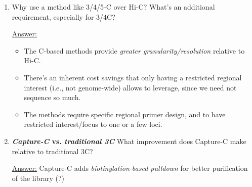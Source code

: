\documentclass{article}
\newenvironment{QandA}{\begin{enumerate}[label=\bfseries Q\arabic*.]}
                       {\end{enumerate}}
\newenvironment{answered}{\par\normalfont\underline{Answer:}}{}
\begin{document}
\begin{QandA}
    \begin{answered}
    These are \textit{populations} of cells (bulk) from which the material for PCR is being taken, and \textit{recombination will likely be incomplete/nonuniversal.}
    \end{answered}
  \item{Why use a method like 3/4/5-C over Hi-C? What's an additional requirement, especially for 3/4C?}
    \begin{answered}
    \begin{itemize}
      \item{The  C-based methods provide \textit{greater granularity/resolution} relative to Hi-C.}
      \item{There's an inherent cost savings that only having a restricted regional interest (i.e., not genome-wide) allows to leverage, since we need not sequence so much.}
      \item{The methods require specific regional primer design, and to have restricted interest/focus to one or a few loci.}
    \end{itemize}
    \end{answered}
  \item{\textbf{\textit{Capture-C} vs. \textit{traditional 3C}} What improvement does Capture-C make relative to traditional 3C?}
    \begin{answered}
    Capture-C adds \textit{biotinylation-based pulldown} for better purification of the library (?)
    \end{answered}
\end{QandA}
\end{document}
